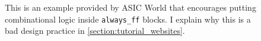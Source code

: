 
\begin{figure}[t]
    \centering
    \caption[
        ASIC World bad example
    ]{
        This is an example provided by ASIC World that encourages putting combinational logic inside \texttt{always_ff} blocks.
        \cite{asicworld} I explain why this is a bad design practice in \autoref{section:tutorial_websites}.
    }
    \label{fig:asicworld}
\end{figure}
